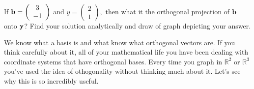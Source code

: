 \begin{problem}
    If ${\bf b} = \left( \begin{array}{c} 3 \\ -1  \end{array} \right)$ and $y = \left(
    \begin{array}{c} 2 \\ 1  \end{array} \right),$ then what it the orthogonal projection of ${\bf b}$
    onto ${\bf y}$?  Find your solution analytically and draw of graph depicting your answer.
% 
% 
\end{problem}
%             

We know what a basis is and what know what orthogonal vectors are.  If you think carefully
about it, all of your mathematical life you have been dealing with coordinate systems that have
orthogonal bases.  Every time you graph in $\mathbb{R}^2$ or $\mathbb{R}^3$ you've used
the idea of othogonality without thinking much about it.  Let's see why this is so
incredibly useful.

